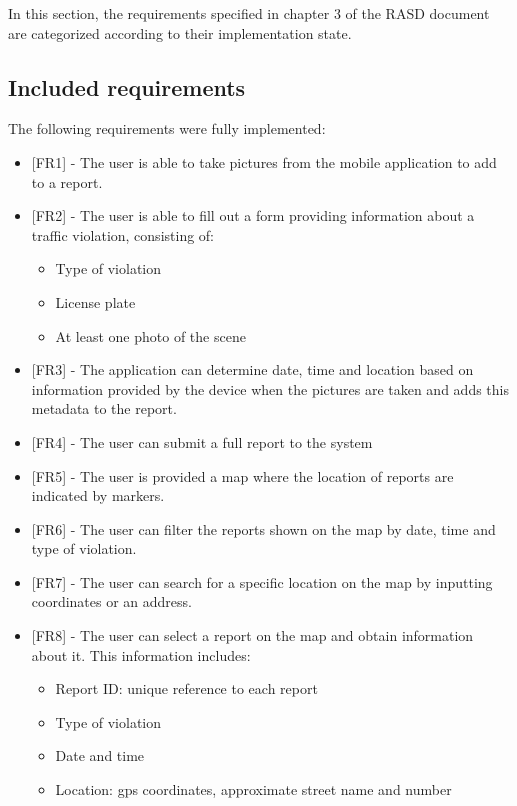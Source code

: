In this section, the requirements specified in chapter 3 of the RASD document are categorized according to their implementation state.\\

\subsection{Included requirements}
The following requirements were fully implemented:

\begin{itemize}[label={}]
            \item {[FR1]} - The user is able to take pictures from the mobile application to add to a report.
            \item {[FR2]} - The user is able to fill out a form providing information about a traffic violation, consisting of:
            \begin{itemize}[label={\textbullet}]
                \item Type of violation
                \item License plate
                \item At least one photo of the scene
            \end{itemize}
            \item {[FR3]} - The application can determine date, time and location based on information provided by the device when the pictures are taken and adds this metadata to the report.
            \item {[FR4]} - The user can submit a full report to the system

            \item {[FR5]} - The user is provided a map where the location of reports are indicated by markers.
            \item {[FR6]} - The user can filter the reports shown on the map by date, time and type of violation.
            \item {[FR7]} - The user can search for a specific location on the map by inputting coordinates or an address.
            \item {[FR8]} - The user can select a report on the map and obtain information about it. This information includes:
            \begin{itemize}[label={\textbullet}]
                \item Report ID: unique reference to each report
                \item Type of violation
                \item Date and time
                \item Location: gps coordinates, approximate street name and number
            \end{itemize}


\end{itemize}
